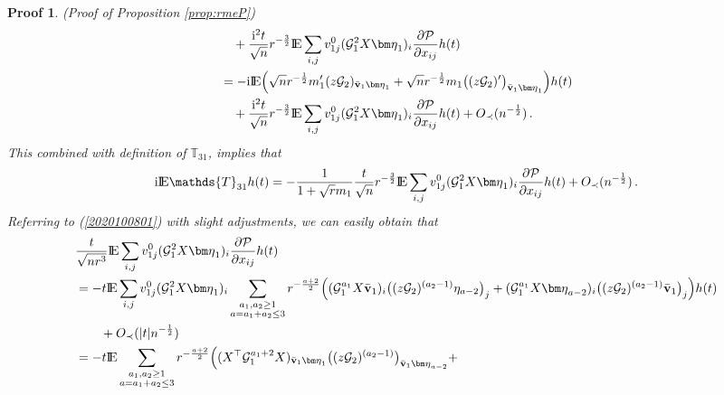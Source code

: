 \documentclass[12pt]{article}
\numberwithin{equation}{section}
\newtheorem{myPro}{Proof}
\theoremstyle{remark}
\newcommand{\1}{{\rm 1}\kern-0.24em{\rm I}}
\newcommand{\E}{{\rm I}\kern-0.18em{\rm E}}
\begin{document}
\begin{appendices}
\begin{myPro}{(Proof of Proposition  \ref{prop:rmeP})}
\begin{align*}
&\quad + \frac{\mathrm{i}^2 t }{\sqrt n} r^{-\frac 32} \E\sum_{i,j} v_{1j}^0  (\mathcal{G}_1^2{X}{\bm \eta}_1)_i   \frac{\partial \mathcal{P} }{\partial x_{ij}}h(t) \notag\\
&= -  \mathrm{i}\E \Big( \sqrt n r^{-\frac 12} m_1' (z\mathcal{G}_2)_{\bar{\bf v}_1 {\bm \eta}_1}  + \sqrt n r^{-\frac 12}m_1 \big((z\mathcal{G}_2)'\big)_{\bar{\bf v}_1 {\bm \eta}_1}  \Big)h(t)\notag\\
&\quad + \frac{\mathrm{i}^2 t }{\sqrt n} r^{-\frac 32} \E\sum_{i,j} v_{1j}^0  (\mathcal{G}_1^2{X}{\bm \eta}_1)_i   \frac{\partial \mathcal{P} }{\partial x_{ij}}h(t) + O_\prec(n^{-\frac 12})\,.
 \end{align*}
 This combined with definition of $\mathds{T}_{31}$, implies that 
 \begin{align*}
 \mathrm{i} \E\mathds{T}_{31}h(t)= - \frac{1}{1+ \sqrt r m_1}  \frac{ t }{\sqrt n} r^{-\frac 32} \E\sum_{i,j} v_{1j}^0  (\mathcal{G}_1^2{X}{\bm \eta}_1)_i   \frac{\partial \mathcal{P} }{\partial x_{ij}}h(t) + O_\prec(n^{-\frac 12})\,.
 \end{align*}
  Referring to (\ref{2020100801}) with slight adjustments, we can  easily obtain that 
 {\small
 \begin{align*}
& \frac{t}{\sqrt {nr^3}} \E\sum_{i,j} v_{1j}^0  (\mathcal{G}_1^2{X}{\bm \eta}_1)_i   \frac{\partial \mathcal{P} }{\partial x_{ij}}h(t)\notag\\
 &= - t\E\sum_{i,j} v_{1j}^0  (\mathcal{G}_1^2{X}{\bm \eta}_1)_i \sum_{\begin{subarray}{c} a_1, a_2\geq 1\\ a=a_1+a_2\leq3\end{subarray}}
 r^{-\frac{a+2}{2}}
 \Big( (\mathcal{G}_1^{a_1}{X}\bar{\bf v}_1)_i \big((z\mathcal{G}_2)^{(a_2-1)}\eta_{a-2}\big)_j + (\mathcal{G}_1^{a_1}{X}{\bm \eta}_{a-2})_i \big((z\mathcal{G}_2)^{(a_2-1)}\bar{\bf v}_1\big)_j\Big)h(t)   \notag\\
 &\qquad + O_\prec(|t|n^{-\frac 12})\nonumber\\
 &=- t\E  \sum_{\begin{subarray}{c} a_1, a_2\geq 1\\ a=a_1+a_2\leq3\end{subarray}}
  r^{-\frac{a+2}{2}}
\Big( ({X}^{\top} \mathcal{G}_1^{a_1+2}{X})_{\bar{\bf v}_1 {\bm \eta}_1} \big( (z\mathcal{G}_2)^{(a_2-1)}\big)_{\bar{\bf v}_1 {\bm \eta}_{a-2}} + 

\end{align*}}
\end{myPro}
\end{appendices}
\end{document}
